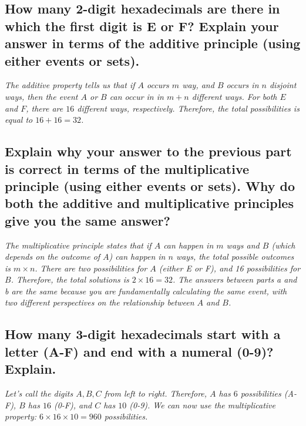 \documentclass{article}
\begin{document}
\subsection{How many 2-digit hexadecimals are there in which the first digit is E or F?
    Explain your answer in terms of the additive principle (using either events or sets).}
\hspace{1cm}\textit{The additive property tells us that if $A$ occurs $m$ way, and $B$
    occurs in $n$ disjoint ways, then the event $A$ or $B$ can occur in in $m+n$ different ways.
    For both $E$ and $F$, there are $16$ different ways, respectively. Therefore, the total
possibilities is equal to $16+16=32$.}
\subsection{Explain why your answer to the previous part is correct in terms of the
    multiplicative principle (using either events or sets).
    Why do both the additive and multiplicative principles give you the same answer?}
\hspace{1cm}\textit{The multiplicative principle states that if $A$ can happen in $m$ ways and $B$
    (which depends on the outcome of $A$) can happen in $n$ ways, the total possible outcomes is
    $m\times n$. There are two possibilities for $A$ (either E or F), and 16 possibilities for $B$. Therefore,
    the total solutions is $2\times 16 = 32$. The answers between parts a and b are the same because
    you are fundamentally calculating the same event, with two different perspectives on the
    relationship between $A$ and $B$.}
\subsection{How many 3-digit hexadecimals start with a letter (A-F) and end with a numeral (0-9)? Explain.}
\hspace{1cm}\textit{Let's call the digits $A,B,C$ from left to right. Therefore, $A$ has $6$ possibilities (A-F),
    $B$ has $16$ (0-F), and $C$ has $10$ (0-9). We can now use the multiplicative property: 
    $6\times 16\times 10 = 960$ possibilities.}
\clearpage
\end{document}
